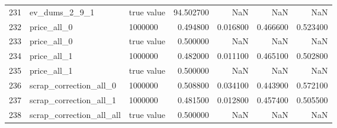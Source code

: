 \begin{tabular}{lllrrrr}
231 & ev_dums_2_9_1 & true value & 94.502700 & NaN & NaN & NaN \\
232 & price_all_0 & 1000000 & 0.494800 & 0.016800 & 0.466600 & 0.523400 \\
233 & price_all_0 & true value & 0.500000 & NaN & NaN & NaN \\
234 & price_all_1 & 1000000 & 0.482000 & 0.011100 & 0.465100 & 0.502800 \\
235 & price_all_1 & true value & 0.500000 & NaN & NaN & NaN \\
236 & scrap_correction_all_0 & 1000000 & 0.508800 & 0.034100 & 0.443900 & 0.572100 \\
237 & scrap_correction_all_1 & 1000000 & 0.481500 & 0.012800 & 0.457400 & 0.505500 \\
238 & scrap_correction_all_all & true value & 0.500000 & NaN & NaN & NaN \\
\bottomrule
\end{tabular}
